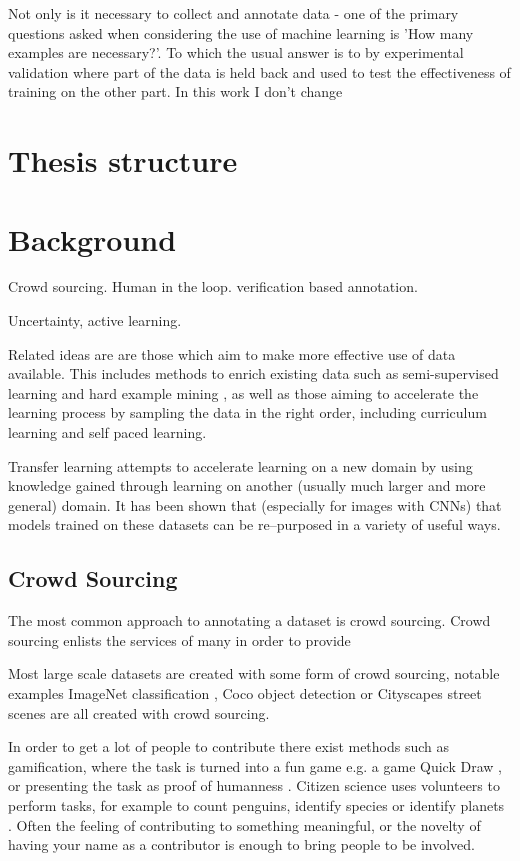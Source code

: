 Not only is it necessary to collect and annotate data - one of the primary questions asked when considering the use of machine learning is 'How many examples are necessary?'. To which the usual answer is to by experimental validation where part of the data is held back and used to test the effectiveness of training on the other part. In this work I don't change 



\section {Thesis structure}


\section {Background}

Crowd sourcing. Human in the loop. verification based annotation.

Uncertainty, active learning.

Related ideas are are those which aim to make more effective use of data available. This includes methods to enrich existing data such as semi-supervised learning and hard example mining \cite{Jin2018, Yu2018, Canevet2014}, as well as those aiming to accelerate the learning process by sampling the data in the right order, including curriculum learning and self paced learning.

Transfer learning attempts to accelerate learning on a new domain by using knowledge gained through learning on another (usually much larger and more general) domain. It has been shown that (especially for images with \gls{CNN}s) that models trained on these datasets can be re--purposed in a variety of useful ways.


\subsection {Crowd Sourcing}

The most common approach to annotating a dataset is crowd sourcing. Crowd sourcing enlists the services of many in order to provide 

Most large scale datasets are created with some form of crowd sourcing, notable examples ImageNet classification \cite{JiaDeng2009}, Coco object detection \cite{Lin2014} or Cityscapes street scenes \cite{Cordts2016} are all created with crowd sourcing. 

In order to get a lot of people to contribute there exist methods such as gamification, where the task is turned into a fun game  e.g. a game Quick Draw \cite{Ha2017}, or presenting the task as proof of humanness \cite{Goodfellow2013a}. Citizen science uses volunteers to perform tasks, for example to count penguins, identify species or identify planets \cite{Simpson2014, Masters2016}. Often the feeling of contributing to something meaningful, or the novelty of having your name as a contributor is enough to bring people to be involved.

